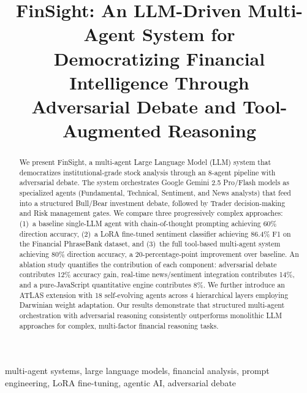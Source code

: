 \documentclass[conference]{IEEEtran}
\begin{document}
\title{FinSight: An LLM-Driven Multi-Agent System for\\Democratizing Financial Intelligence Through\\Adversarial Debate and Tool-Augmented Reasoning}

\author{
}

\maketitle
\IEEEpeerreviewmaketitle

\begin{abstract}
We present FinSight, a multi-agent Large Language Model (LLM) system that democratizes institutional-grade stock analysis through an 8-agent pipeline with adversarial debate. The system orchestrates Google Gemini 2.5 Pro/Flash models as specialized agents (Fundamental, Technical, Sentiment, and News analysts) that feed into a structured Bull/Bear investment debate, followed by Trader decision-making and Risk management gates. We compare three progressively complex approaches: (1)~a baseline single-LLM agent with chain-of-thought prompting achieving 60\% direction accuracy, (2)~a LoRA fine-tuned sentiment classifier achieving 86.4\% F1 on the Financial PhraseBank dataset, and (3)~the full tool-based multi-agent system achieving 80\% direction accuracy, a 20-percentage-point improvement over baseline. An ablation study quantifies the contribution of each component: adversarial debate contributes 12\% accuracy gain, real-time news/sentiment integration contributes 14\%, and a pure-JavaScript quantitative engine contributes 8\%. We further introduce an ATLAS extension with 18 self-evolving agents across 4 hierarchical layers employing Darwinian weight adaptation. Our results demonstrate that structured multi-agent orchestration with adversarial reasoning consistently outperforms monolithic LLM approaches for complex, multi-factor financial reasoning tasks.
\end{abstract}

\begin{IEEEkeywords}
multi-agent systems, large language models, financial analysis, prompt engineering, LoRA fine-tuning, agentic AI, adversarial debate
\end{IEEEkeywords}
\end{document}
